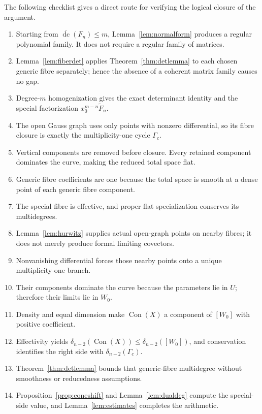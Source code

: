 \documentclass[acmsmall,screen,nonacm]{acmart}
\theoremstyle{definition}
\theoremstyle{remark}
\DeclareMathOperator{\dc}{dc}
\DeclareMathOperator{\Con}{Con}
\newcommand{\pdeg}{\delta}
\newcommand{\dcb}{\overline{\dc}}
\begin{document}
The following checklist gives a direct route for verifying the logical closure
of the argument.

\begin{enumerate}[leftmargin=2.2em,itemsep=3pt]
\item Starting from $\dcb(F_n)\le m$, Lemma~\ref{lem:normalform} produces a
regular polynomial family.  It does not require a regular family of matrices.
\item Lemma~\ref{lem:fiberdet} applies Theorem~\ref{thm:detlemma} to each
chosen generic fibre separately; hence the absence of a coherent matrix family
causes no gap.
\item Degree-$m$ homogenization gives the exact determinant identity and the
special factorization $x_0^{m-n}\widetilde F_n$.
\item The open Gauss graph uses only points with nonzero differential, so its
fibre closure is exactly the multiplicity-one cycle $\Gamma_c$.
\item Vertical components are removed before closure.  Every retained
component dominates the curve, making the reduced total space flat.
\item Generic fibre coefficients are one because the total space is smooth at
a dense point of each generic fibre component.
\item The special fibre is effective, and proper flat specialization conserves
its multidegrees.
\item Lemma~\ref{lem:hurwitz} supplies actual open-graph points on nearby
fibres; it does not merely produce formal limiting covectors.
\item Nonvanishing differential forces those nearby points onto a unique
multiplicity-one branch.
\item Their components dominate the curve because the parameters lie in $U$;
therefore their limits lie in $W_0$.
\item Density and equal dimension make $\Con(X)$ a component of $[W_0]$ with
positive coefficient.
\item Effectivity yields
$\pdeg_{n-2}(\Con(X))\le\pdeg_{n-2}([W_0])$, and conservation identifies the
right side with $\pdeg_{n-2}(\Gamma_c)$.
\item Theorem~\ref{thm:detlemma} bounds that generic-fibre multidegree without
smoothness or reducedness assumptions.
\item Proposition~\ref{prop:coneshift} and Lemma~\ref{lem:dualdeg} compute the
special-side value, and Lemma~\ref{lem:estimates} completes the arithmetic.
\end{enumerate}
\end{document}
